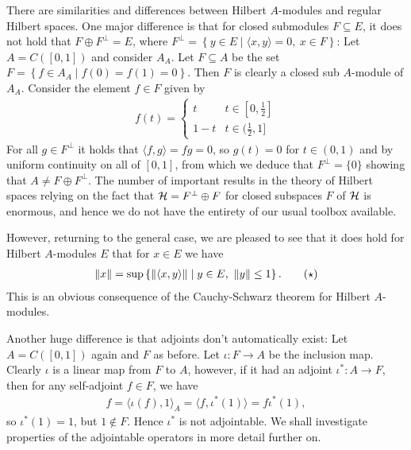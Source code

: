 \begin{note}
	There are similarities and differences between Hilbert $A$-modules and regular Hilbert spaces. One major difference is that for closed submodules $F\subseteq E$, it does not hold that $F \oplus F^\perp=E$, where $F^\perp = \left\{ y \in E \mid \langle x,y\rangle = 0, \ x \in F \right\}$: Let $A=C([0,1])$ and consider $A_A$. Let $F\subseteq A$ be the set $F = \left\{f \in A_A \mid f(0)=f(1)=0  \right\}$. Then $F$ is clearly a closed sub $A$-module of $A_A$. Consider the element $f \in F$ given by
	\begin{align*}
		f(t) = \begin{cases}
			t & t \in [0,\frac12]\\
		1-t & t \in (\frac12,1]
		\end{cases}
	\end{align*}
	For all $g \in F^\perp$ it holds that $\langle f,g\rangle = fg = 0$, so $g(t)=0$ for $t \in (0,1)$ and by uniform continuity on all of $[0,1]$, from which we deduce that $F^\perp = \{0\}$ showing that $A \neq F \oplus F^\perp$. The number of important results in the theory of Hilbert spaces relying on the fact that $\mathcal{H} =  F^\perp \oplus F$ for closed subspaces $F$ of $\mathcal{H}$ is enormous, and hence we do not have the entirety of our usual toolbox available. 

	However, returning to the general case, we are pleased to see that it does hold for Hilbert $A$-modules $E$ that for $x \in E$ we have
	\begin{align}
		\left\lVert x \right\rVert = \sup\left\{ \left\lVert \langle x , y \rangle \right\rVert \mid y \in E, \ \left\lVert y \right\rVert \leq 1 \right\}. \tag{$\star$}
		\label{eq:0}
	\end{align}
	This is an obvious consequence of the Cauchy-Schwarz theorem for Hilbert $A$-modules. 

	Another huge difference is that adjoints don't automatically exist: Let $A = C([0,1])$ again and $F$ as before. Let $ \iota \colon F \to A$ be the inclusion map. Clearly $\iota$ is a linear map from $F$ to $A$, however, if it had an adjoint $\iota^* \colon A \to F$, then for any self-adjoint $f \in F$, we have
	\begin{align*}
		 f = \langle \iota(f) , 1 \rangle_A = \langle f , \iota^*(1)\rangle = f \iota^*(1),
	\end{align*}
	so $\iota^*(1)=1$, but $1 \not\in F$. Hence $\iota^*$ is not adjointable. We shall investigate properties of the adjointable operators in more detail further on.
\end{note}

